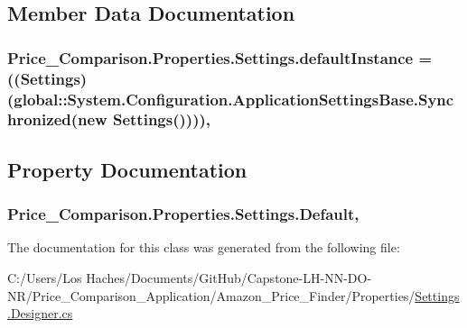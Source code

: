 \subsection{Member Data Documentation}
\hypertarget{class_price___comparison_1_1_properties_1_1_settings_a2088e8d1c54b01a18c77c02bf54d95ff}{
\subsubsection[{default\-Instance}]{ Price\-\_\-\-Comparison.\-Properties.\-Settings.\-default\-Instance = (({\bf Settings})(global\-::\-System.\-Configuration.\-Application\-Settings\-Base.\-Synchronized(new {\bf Settings}())))\hspace{0.3cm}{\ttfamily [static]}, {\ttfamily [private]}}}\label{class_price___comparison_1_1_properties_1_1_settings_a2088e8d1c54b01a18c77c02bf54d95ff}


\subsection{Property Documentation}
\hypertarget{class_price___comparison_1_1_properties_1_1_settings_aee3de7b3f05463fe9e7255cd21ef15d3}{
\subsubsection[{Default}]{ Price\-\_\-\-Comparison.\-Properties.\-Settings.\-Default\hspace{0.3cm}{\ttfamily [static]}, {\ttfamily [get]}}}\label{class_price___comparison_1_1_properties_1_1_settings_aee3de7b3f05463fe9e7255cd21ef15d3}


The documentation for this class was generated from the following file\-:\begin{DoxyCompactItemize}
\item 
C\-:/\-Users/\-Los Haches/\-Documents/\-Git\-Hub/\-Capstone-\/\-L\-H-\/\-N\-N-\/\-D\-O-\/\-N\-R/\-Price\-\_\-\-Comparison\-\_\-\-Application/\-Amazon\-\_\-\-Price\-\_\-\-Finder/\-Properties/\hyperlink{_settings_8_designer_8cs}{Settings.\-Designer.\-cs}\end{DoxyCompactItemize}
